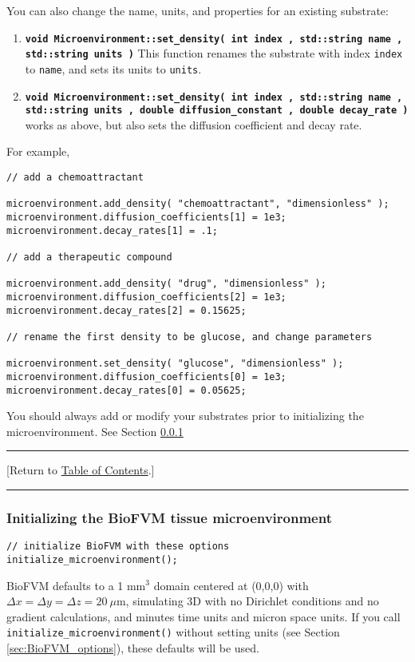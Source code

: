 \documentclass[12pt]{article}
\newcommand{\micron}{\mu\textrm{m}}
\renewcommand{\v}{\verb}
\newcommand{\smallcode}[1]{\textbf{\texttt{#1}}}
\newcommand{\TOClink}{\begin{center}\hrule\vskip-10pt\phantom{.}\hfill[Return to \hyperlink{TOC}{Table of Contents}.]\hfill\phantom{.}\vskip3pt\hrule\end{center}}
\begin{document}
You can also change the name, units, and properties for an existing substrate: 
\begin{enumerate}
\item 
\smallcode{void Microenvironment::set\_density( int index , std::string name , std::string units )} This 
function renames the substrate with index \v|index| to \v|name|, and sets its units to \v|units|. 

\item 
\smallcode{void Microenvironment::set\_density( int index , std::string name , std::string units , 
double diffusion\_constant , double decay\_rate )} works as above, but 
also sets the diffusion coefficient and decay rate. 
\end{enumerate}

For example, 
\begin{verbatim}
// add a chemoattractant 

microenvironment.add_density( "chemoattractant", "dimensionless" ); 
microenvironment.diffusion_coefficients[1] = 1e3; 
microenvironment.decay_rates[1] = .1; 	
	
// add a therapeutic compound
	
microenvironment.add_density( "drug", "dimensionless" ); 
microenvironment.diffusion_coefficients[2] = 1e3; 
microenvironment.decay_rates[2] = 0.15625; 	
	
// rename the first density to be glucose, and change parameters 
	
microenvironment.set_density( "glucose", "dimensionless" ); 
microenvironment.diffusion_coefficients[0] = 1e3; 
microenvironment.decay_rates[0] = 0.05625; 	
\end{verbatim}

You should always add or modify your substrates prior to initializing the microenvironment. See 
Section \ref{sec:BioFVM_initialize}

\TOClink 

\subsubsection{Initializing the BioFVM tissue microenvironment}
\label{sec:BioFVM_initialize}

\begin{verbatim}
// initialize BioFVM with these options
initialize_microenvironment(); 	
\end{verbatim}

BioFVM defaults to a 1 mm${}^3$ domain centered at 
(0,0,0) with $\Delta x = \Delta y = \Delta z = 20 \:\micron$, simulating 3D with no Dirichlet conditions 
and no gradient calculations, and minutes time units 
and micron space units. If you call 
\v|initialize_microenvironment()| without setting units (see Section \ref{sec:BioFVM_options}), 
these defaults will be used. 
\end{document}
